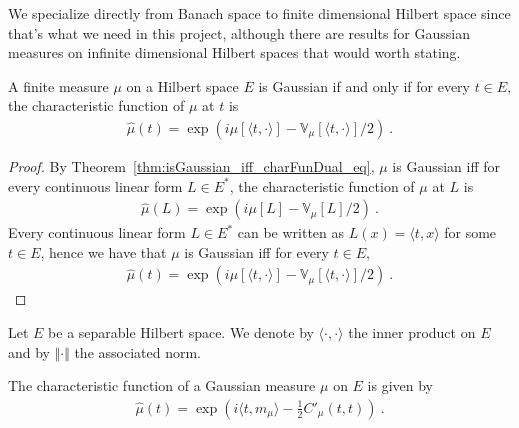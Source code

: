 We specialize directly from Banach space to finite dimensional Hilbert space since that's what we need in this project, although there are results for Gaussian measures on infinite dimensional Hilbert spaces that would worth stating.

\begin{lemma}\label{lem:isGaussian_iff_charFun_eq}
  \leanok
A finite measure $\mu$ on a Hilbert space $E$ is Gaussian if and only if for every $t \in E$, the characteristic function of $\mu$ at $t$ is
\begin{align*}
  \hat{\mu}(t) =  \exp\left(i \mu[\langle t, \cdot \rangle] - \mathbb{V}_\mu[\langle t, \cdot \rangle] / 2\right) \: .
\end{align*}
\end{lemma}

\begin{proof}\leanok
By Theorem~\ref{thm:isGaussian_iff_charFunDual_eq}, $\mu$ is Gaussian iff for every continuous linear form $L \in E^*$, the characteristic function of $\mu$ at $L$ is
\begin{align*}
  \hat{\mu}(L) = \exp\left(i \mu[L] - \mathbb{V}_\mu[L] / 2\right) \: .
\end{align*}
Every continuous linear form $L \in E^*$ can be written as $L(x) = \langle t, x \rangle$ for some $t \in E$, hence we have that $\mu$ is Gaussian iff for every $t \in E$,
\begin{align*}
  \hat{\mu}(t) = \exp\left(i \mu[\langle t, \cdot \rangle] - \mathbb{V}_\mu[\langle t, \cdot \rangle] / 2\right) \: .
\end{align*}
\end{proof}

Let $E$ be a separable Hilbert space. We denote by $\langle \cdot, \cdot \rangle$ the inner product on $E$ and by $\Vert \cdot \Vert$ the associated norm.

\begin{lemma}\label{lem:IsGaussian.charFun_eq}
  \leanok
The characteristic function of a Gaussian measure $\mu$ on $E$ is given by
\begin{align*}
  \hat{\mu}(t) = \exp\left(i \langle t, m_\mu \rangle - \frac{1}{2} C'_\mu(t, t)\right) \: .
\end{align*}
\end{lemma}

